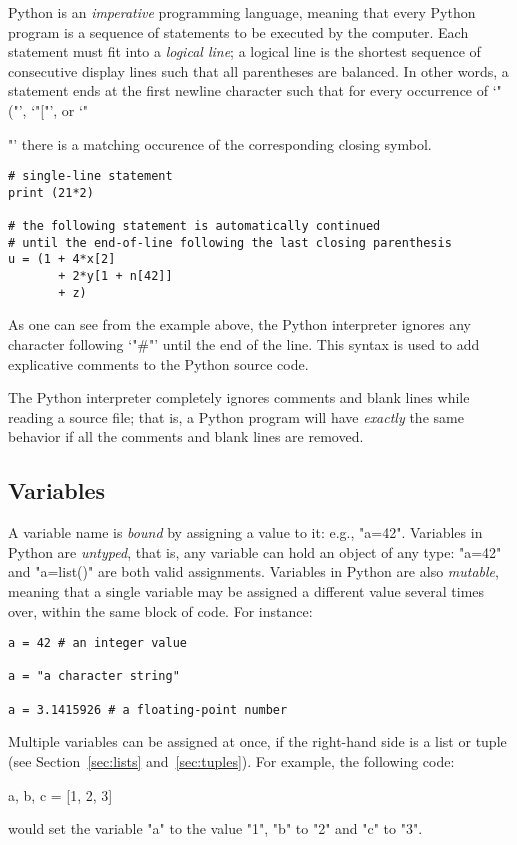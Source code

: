 Python is an \emph{imperative} programming language, meaning that
every Python program is a sequence of statements to be executed by the
computer.  Each statement must fit into a \emph{logical line}; a
logical line is the shortest sequence of consecutive display lines
such that all parentheses are balanced.  In other words, a statement
ends at the first newline character such that for every occurrence of
`"("', `"["', or `"{"' there is a matching occurence of the
corresponding closing symbol.
\begin{lstlisting}
# single-line statement
print (21*2)

# the following statement is automatically continued
# until the end-of-line following the last closing parenthesis
u = (1 + 4*x[2] 
       + 2*y[1 + n[42]]
       + z)
\end{lstlisting}
As one can see from the example above, the Python interpreter ignores
any character following `"#"' until the end of the line.  This
syntax is used to add explicative comments to the Python source code.

The Python interpreter completely ignores comments and blank lines
while reading a source file; that is, a Python program will have
\emph{exactly} the same behavior if all the comments and blank lines
are removed.

\subsection{Variables}
\label{sec:variables}

A variable name is \emph{bound} by assigning a value to it: e.g.,
"a=42".  Variables in Python are \emph{untyped}, that is, any
variable can hold an object of any type: "a=42" and "a=list()"
are both valid assignments. Variables in Python are also
\emph{mutable}, meaning that a single variable may be assigned a
different value several times over, within the same block of code.
For instance:
\begin{lstlisting}
a = 42 # an integer value

a = "a character string"

a = 3.1415926 # a floating-point number
\end{lstlisting}

Multiple variables can be assigned at once, if the right-hand side is
a list or tuple (see Section~\ref{sec:lists} and~\ref{sec:tuples}). For
example, the following code:
\begin{codexmp}
  a, b, c = [1, 2, 3]
\end{codexmp}
would set the variable "a" to the value "1", "b" to "2" and "c" to
"3".

}
